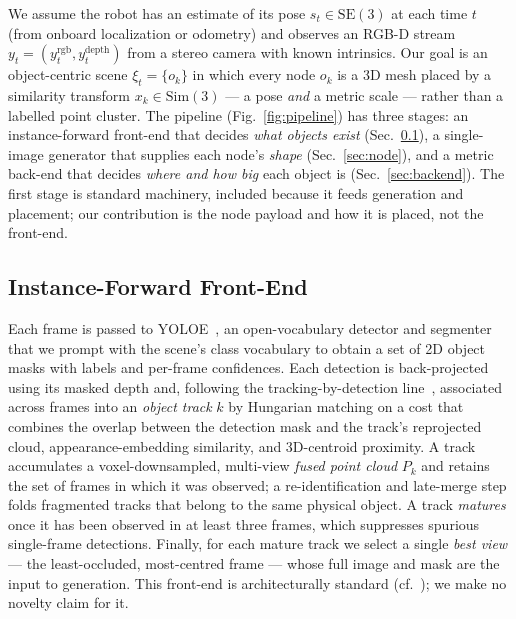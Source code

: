 \documentclass[conference]{IEEEtran}
\begin{document}
We assume the robot has an estimate of its pose $s_t \in \mathrm{SE}(3)$ at each
time $t$ (from onboard localization or odometry) and observes an RGB-D stream
$y_t = (y_t^{\text{rgb}}, y_t^{\text{depth}})$ from a stereo camera with known
intrinsics. Our goal is an object-centric scene $\xi_t = \{o_k\}$ in which every
node $o_k$ is a 3D mesh placed by a similarity transform $x_k \in
\mathrm{Sim}(3)$ --- a pose \emph{and} a metric scale --- rather than a labelled
point cluster. The pipeline (Fig.~\ref{fig:pipeline}) has three stages: an
instance-forward front-end that decides \emph{what objects exist}
(Sec.~\ref{sec:frontend}), a single-image generator that supplies each node's
\emph{shape} (Sec.~\ref{sec:node}), and a metric back-end that decides
\emph{where and how big} each object is (Sec.~\ref{sec:backend}). The first
stage is standard machinery, included because it feeds generation and placement;
our contribution is the node payload and how it is placed, not the front-end.

\subsection{Instance-Forward Front-End}
\label{sec:frontend}
Each frame is passed to YOLOE~\cite{yoloe}, an open-vocabulary detector and
segmenter that we prompt with the scene's class vocabulary to obtain a set of
2D object masks with labels and per-frame confidences. Each detection is
back-projected using its masked depth and, following the tracking-by-detection
line~\cite{conceptgraphs}, associated across frames into an \emph{object track}
$k$ by Hungarian matching on a cost that combines the overlap between the
detection mask and the track's reprojected cloud, appearance-embedding
similarity, and 3D-centroid proximity. A track accumulates a
voxel-downsampled, multi-view \emph{fused point cloud} $P_k$ and retains the set
of frames in which it was observed; a re-identification and late-merge step
folds fragmented tracks that belong to the same physical object. A track
\emph{matures} once it has been observed in at least three frames, which
suppresses spurious single-frame detections. Finally, for each mature track we
select a single \emph{best view} --- the least-occluded, most-centred frame ---
whose full image and mask are the input to generation. This front-end is
architecturally standard (cf.~\cite{conceptgraphs,hovsg}); we make no novelty
claim for it.
\end{document}
